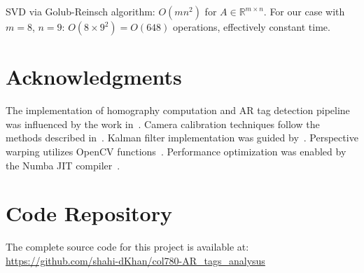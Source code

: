 \documentclass[9pt,a4paper,twocolumn,twoside]{tau-class/tau}
\begin{document}
    SVD via Golub-Reinsch algorithm: $O(mn^2)$ for $A \in \mathbb{R}^{m \times n}$. For our case with $m=8$, $n=9$: $O(8 \times 9^2) = O(648)$ operations, effectively constant time.


\section*{Acknowledgments}
The implementation of homography computation and AR tag detection pipeline was influenced by the work in~\cite{rastogi_artag}. Camera calibration techniques follow the methods described in~\cite{opencv_calibration}. Kalman filter implementation was guided by~\cite{rlabbe_kalman}. Perspective warping utilizes OpenCV functions~\cite{opencv_warp}. Performance optimization was enabled by the Numba JIT compiler~\cite{numba_jit}.

\section*{Code Repository}
The complete source code for this project is available at: \href{https://github.com/shahi-dKhan/col780-AR_tags_analysus}{https://github.com/shahi-dKhan/col780-AR\_tags\_analysus}


\printbibliography[heading=bibintoc,title={References}]

\end{document}
